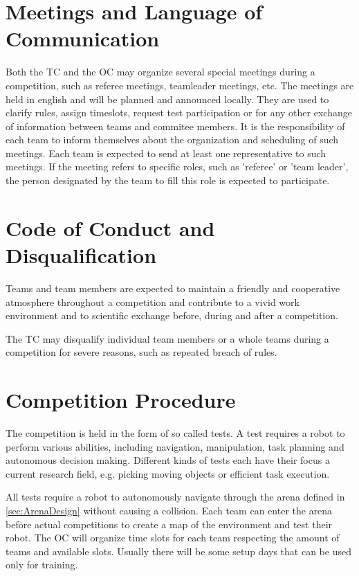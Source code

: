 \section{Meetings and Language of Communication}

Both the TC and the OC may organize several special meetings during a competition, 
such as referee meetings, teamleader meetings, etc.
The meetings are held in english and will be planned and announced locally.
They are used to clarify rules, assign timeslots, request test participation or for any other exchange of information between teams and commitee members.
It is the responsibility of each team to inform themselves about the organization and scheduling of such meetings.
Each team is expected to send at least one representative to such meetings. If the meeting refers to specific roles, such as 'referee' or 'team leader', the person designated by the team to fill this role is expected to participate.


\section{Code of Conduct and Disqualification}
Teams and team members are expected to maintain a friendly and cooperative atmosphere throughout a competition and contribute to a vivid work environment and to scientific exchange before, during and after a competition.
\par
The TC may disqualify individual team members or a whole teams during a competition for severe reasons, such as repeated breach of rules.


\section{Competition Procedure}

The competition is held in the form of so called tests.
A test requires a robot to perform various abilities, including navigation, manipulation, task planning and autonomous decision making.
Different kinds of tests each have their focus a current research field, e.g. picking moving objects or efficient task execution.

All tests require a robot to autonomously navigate through the arena defined in \ref{sec:ArenaDesign} without causing a collision. Each team can enter the arena before actual competitions to create a map of the environment and test their robot. The OC will organize time slots for each team respecting the amount of teams and available slots. Usually there will be some setup days that can be used only for training.


